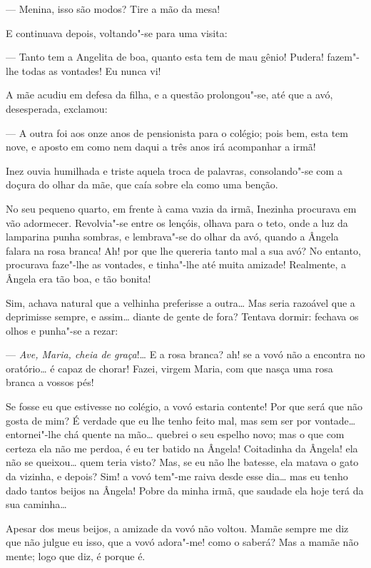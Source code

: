 --- Menina, isso são modos? Tire a mão da mesa!

E continuava depois, voltando"-se para uma visita:

--- Tanto tem a Angelita de boa, quanto esta tem de mau gênio! Pudera!
fazem"-lhe todas as vontades! Eu nunca vi!

A mãe acudiu em defesa da filha, e a questão prolongou"-se, até que a
avó, desesperada, exclamou:

--- A outra foi aos onze anos de pensionista para o colégio; pois bem,
esta tem nove, e aposto em como nem daqui a três anos irá acompanhar a
irmã!

Inez ouvia humilhada e triste aquela troca de palavras, consolando"-se
com a doçura do olhar da mãe, que caía sobre ela como uma benção.

No seu pequeno quarto, em frente à cama vazia da irmã, Inezinha
procurava em vão adormecer. Revolvia"-se entre os lençóis, olhava para o
teto, onde a luz da lamparina punha sombras, e lembrava"-se do olhar da
avó, quando a Ângela falara na rosa branca! Ah! por que lhe quereria
tanto mal a sua avó? No entanto, procurava faze"-lhe as vontades, e
tinha"-lhe até muita amizade! Realmente, a Ângela era tão boa, e tão
bonita!

Sim, achava natural que a velhinha preferisse a outra\ldots{} Mas seria
razoável que a deprimisse sempre, e assim\ldots{} diante de gente de fora?
Tentava dormir: fechava os olhos e punha"-se a rezar:

--- \emph{Ave, Maria, cheia de graça}!\ldots{} E a rosa branca? ah! se a vovó
não a encontra no oratório\ldots{} é capaz de chorar! Fazei, virgem Maria,
com que nasça uma rosa branca a vossos pés!

Se fosse eu que estivesse no colégio, a vovó estaria contente! Por que
será que não gosta de mim? É verdade que eu lhe tenho feito mal, mas sem
ser por vontade\ldots{} entornei"-lhe chá quente na mão\ldots{} quebrei o seu
espelho novo; mas o que com certeza ela não me perdoa, é eu ter batido
na Ângela! Coitadinha da Ângela! ela não se queixou\ldots{} quem teria visto?
Mas, se eu não lhe batesse, ela matava o gato da vizinha, e depois? Sim!
a vovó tem"-me raiva desde esse dia\ldots{} mas eu tenho dado tantos beijos na
Ângela! Pobre da minha irmã, que saudade ela hoje terá da sua caminha\ldots{}

Apesar dos meus beijos, a amizade da vovó não voltou. Mamãe sempre me
diz que não julgue eu isso, que a vovó adora"-me! como o saberá? Mas a
mamãe não mente; logo que diz, é porque é.

